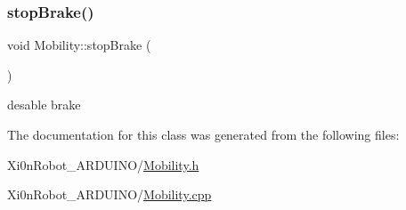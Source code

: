 \subsubsection{\texorpdfstring{stop\+Brake()}{stopBrake()}}
{\footnotesize\ttfamily void Mobility\+::stop\+Brake (\begin{DoxyParamCaption}{ }\end{DoxyParamCaption})}



desable brake 



The documentation for this class was generated from the following files\+:\begin{DoxyCompactItemize}
\item 
Xi0n\+Robot\+\_\+\+A\+R\+D\+U\+I\+N\+O/\hyperlink{_mobility_8h}{Mobility.\+h}\item 
Xi0n\+Robot\+\_\+\+A\+R\+D\+U\+I\+N\+O/\hyperlink{_mobility_8cpp}{Mobility.\+cpp}\end{DoxyCompactItemize}
